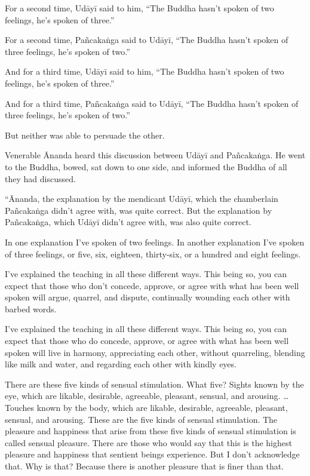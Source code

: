 \documentclass[12pt,openany]{book}%
\begin{document}
For a second time, \textsanskrit{Udāyī} said to him, “The Buddha hasn’t spoken of two feelings, he’s spoken of three.” 

For a second time, \textsanskrit{Pañcakaṅga} said to \textsanskrit{Udāyī}, “The Buddha hasn’t spoken of three feelings, he’s spoken of two.” 

And for a third time, \textsanskrit{Udāyī} said to him, “The Buddha hasn’t spoken of two feelings, he’s spoken of three.” 

And for a third time, \textsanskrit{Pañcakaṅga} said to \textsanskrit{Udāyī}, “The Buddha hasn’t spoken of three feelings, he’s spoken of two.” 

But neither was able to persuade the other. 

Venerable Ānanda heard this discussion between \textsanskrit{Udāyī} and \textsanskrit{Pañcakaṅga}. He went to the Buddha, bowed, sat down to one side, and informed the Buddha of all they had discussed. 

“Ānanda, the explanation by the mendicant \textsanskrit{Udāyī}, which the chamberlain \textsanskrit{Pañcakaṅga} didn’t agree with, was quite correct. But the explanation by \textsanskrit{Pañcakaṅga}, which \textsanskrit{Udāyī} didn’t agree with, was also quite correct. 

In one explanation I’ve spoken of two feelings. In another explanation I’ve spoken of three feelings, or five, six, eighteen, thirty-six, or a hundred and eight feelings. 

I’ve explained the teaching in all these different ways. This being so, you can expect that those who don’t concede, approve, or agree with what has been well spoken will argue, quarrel, and dispute, continually wounding each other with barbed words. 

I’ve explained the teaching in all these different ways. This being so, you can expect that those who do concede, approve, or agree with what has been well spoken will live in harmony, appreciating each other, without quarreling, blending like milk and water, and regarding each other with kindly eyes. 

There are these five kinds of sensual stimulation. What five? Sights known by the eye, which are likable, desirable, agreeable, pleasant, sensual, and arousing. … Touches known by the body, which are likable, desirable, agreeable, pleasant, sensual, and arousing. These are the five kinds of sensual stimulation. The pleasure and happiness that arise from these five kinds of sensual stimulation is called sensual pleasure. There are those who would say that this is the highest pleasure and happiness that sentient beings experience. But I don’t acknowledge that. Why is that? Because there is another pleasure that is finer than that. 
\end{document}
